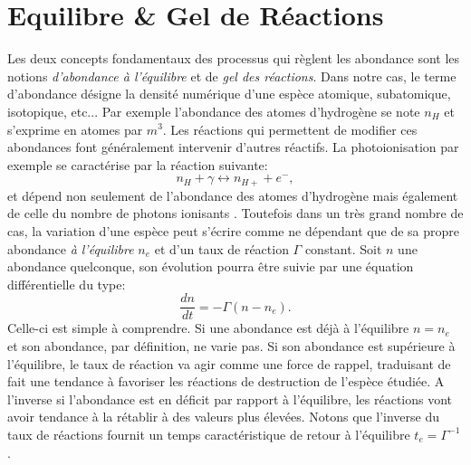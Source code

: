 \section{Equilibre \& Gel de Réactions}
Les deux concepts fondamentaux des processus qui règlent les abondance sont les notions \textit{d'abondance à l'équilibre} et de \textit{gel des réactions}. Dans notre cas, le terme d'abondance désigne la densité numérique d'une espèce atomique, subatomique, isotopique, etc... Par exemple l'abondance des atomes d'hydrogène se note $n_H$ et s'exprime en atomes par $m^3$. Les réactions qui permettent de modifier ces abondances font généralement intervenir d'autres réactifs. La photoionisation par exemple se caractérise par la réaction suivante:
\begin{equation}
n_H+\gamma \leftrightarrow n_{H+} + e^-,
\end{equation}
et dépend non seulement de l'abondance des atomes d'hydrogène mais également de celle du nombre de photons ionisants . Toutefois dans un très grand nombre de cas, la variation d'une espèce peut s'écrire comme ne dépendant que de sa propre abondance \textit{à l'équilibre} $n_e$ et d'un taux de réaction $\Gamma$ constant. Soit $n$ une abondance quelconque, son évolution pourra être suivie par une équation différentielle du type:
\begin{equation}
\frac{dn}{dt}=-\Gamma (n-n_e).
\end{equation}
Celle-ci est simple à comprendre. Si une abondance est déjà à l'équilibre $n=n_e$ et son abondance, par définition, ne varie pas. Si son abondance est supérieure à l'équilibre, le taux de réaction va agir comme une force de rappel, traduisant de fait une tendance à favoriser les réactions de destruction de l'espèce étudiée. A l'inverse si l'abondance est en déficit par rapport à l'équilibre, les réactions vont avoir tendance à la rétablir à des valeurs plus élevées. Notons que  l'inverse du taux de réactions fournit un temps caractéristique de retour à l'équilibre $t_e=\Gamma^{-1}$.

